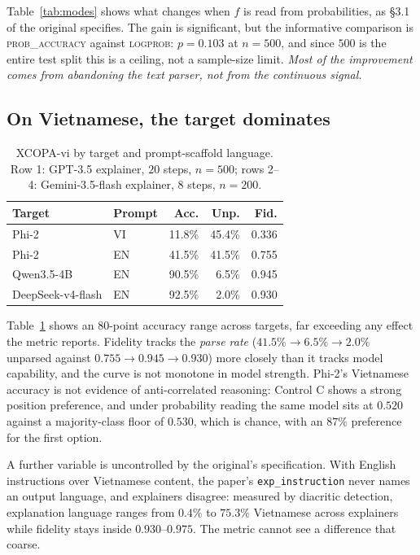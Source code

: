 \documentclass[11pt]{article}
\begin{document}
Table~\ref{tab:modes} shows what changes when $f$ is read from probabilities, as
\S3.1 of the original specifies. The gain is significant, but the informative
comparison is \textsc{prob\_accuracy} against \textsc{logprob}: $p=0.103$ at
$n=500$, and since $500$ is the entire test split this is a ceiling, not a
sample-size limit. \emph{Most of the improvement comes from abandoning the text
parser, not from the continuous signal.}

\subsection{On Vietnamese, the target dominates}
\label{sec:vi}

\begin{table}[t]
\centering\small
\begin{tabular}{llrrr}
\toprule
\textbf{Target} & \textbf{Prompt} & \textbf{Acc.} & \textbf{Unp.} & \textbf{Fid.} \\
\midrule
Phi-2             & VI & 11.8\% & 45.4\% & 0.336 \\
Phi-2             & EN & 41.5\% & 41.5\% & 0.755 \\
Qwen3.5-4B        & EN & 90.5\% & 6.5\%  & 0.945 \\
DeepSeek-v4-flash & EN & 92.5\% & 2.0\%  & 0.930 \\
\bottomrule
\end{tabular}
\caption{XCOPA-vi by target and prompt-scaffold language. Row 1: GPT-3.5
explainer, $20$ steps, $n{=}500$; rows 2--4: Gemini-3.5-flash explainer, $8$
steps, $n{=}200$.}
\label{tab:targets}
\end{table}

Table~\ref{tab:targets} shows an $80$-point accuracy range across targets, far
exceeding any effect the metric reports. Fidelity tracks the \emph{parse rate}
($41.5\% \to 6.5\% \to 2.0\%$ unparsed against $0.755 \to 0.945 \to 0.930$) more
closely than it tracks model capability, and the curve is not monotone in model
strength. Phi-2's Vietnamese accuracy is not evidence of anti-correlated
reasoning: Control C shows a strong position preference, and under probability
reading the same model sits at $0.520$ against a majority-class floor of
$0.530$, which is chance, with an $87\%$ preference for the first option.

A further variable is uncontrolled by the original's specification. With English
instructions over Vietnamese content, the paper's \texttt{exp\_instruction} never
names an output language, and explainers disagree: measured by diacritic
detection, explanation language ranges from $0.4\%$ to $75.3\%$ Vietnamese across
explainers while fidelity stays inside $0.930$--$0.975$. The metric cannot see a
difference that coarse.
\end{document}
